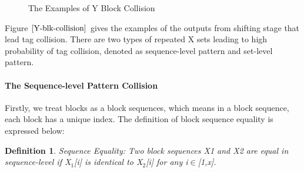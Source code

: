 \documentclass{article}
\newtheorem{defination}{Definition}[section]
\begin{document}
\begin{figure}
{}
 \caption{The Examples of Y Block Collision}
 \label{fig: Y-blk-collision}
\end{figure}
Figure $\ref{Y-blk-collision}$ gives the examples of the outputs from shifting
stage that lead tag collision. There are two types of repeated X sets leading to
high probability of tag collision, denoted as sequence-level pattern and
set-level pattern.
\paragraph{The Sequence-level Pattern Collision}
Firstly, we treat blocks as a block sequences, which means in a block sequence, each block has a unique index. The definition of block sequence equality is expressed below:
\begin{defination}
Sequence Equality: Two block sequences X1 and X2 are equal in sequence-level if X$_1$[i] is identical to X$_2$[i] for any i$\in$[1,x].
\end{defination}
\end{document}
